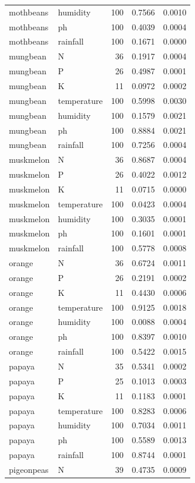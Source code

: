 \begin{tabular}{llrrr}
mothbeans & humidity & 100 & 0.7566 & 0.0010 \\
mothbeans & ph & 100 & 0.4039 & 0.0004 \\
mothbeans & rainfall & 100 & 0.1671 & 0.0000 \\
mungbean & N & 36 & 0.1917 & 0.0004 \\
mungbean & P & 26 & 0.4987 & 0.0001 \\
mungbean & K & 11 & 0.0972 & 0.0002 \\
mungbean & temperature & 100 & 0.5998 & 0.0030 \\
mungbean & humidity & 100 & 0.1579 & 0.0021 \\
mungbean & ph & 100 & 0.8884 & 0.0021 \\
mungbean & rainfall & 100 & 0.7256 & 0.0004 \\
muskmelon & N & 36 & 0.8687 & 0.0004 \\
muskmelon & P & 26 & 0.4022 & 0.0012 \\
muskmelon & K & 11 & 0.0715 & 0.0000 \\
muskmelon & temperature & 100 & 0.0423 & 0.0004 \\
muskmelon & humidity & 100 & 0.3035 & 0.0001 \\
muskmelon & ph & 100 & 0.1601 & 0.0001 \\
muskmelon & rainfall & 100 & 0.5778 & 0.0008 \\
orange & N & 36 & 0.6724 & 0.0011 \\
orange & P & 26 & 0.2191 & 0.0002 \\
orange & K & 11 & 0.4430 & 0.0006 \\
orange & temperature & 100 & 0.9125 & 0.0018 \\
orange & humidity & 100 & 0.0088 & 0.0004 \\
orange & ph & 100 & 0.8397 & 0.0010 \\
orange & rainfall & 100 & 0.5422 & 0.0015 \\
papaya & N & 35 & 0.5341 & 0.0002 \\
papaya & P & 25 & 0.1013 & 0.0003 \\
papaya & K & 11 & 0.1183 & 0.0001 \\
papaya & temperature & 100 & 0.8283 & 0.0006 \\
papaya & humidity & 100 & 0.7034 & 0.0011 \\
papaya & ph & 100 & 0.5589 & 0.0013 \\
papaya & rainfall & 100 & 0.8744 & 0.0001 \\
pigeonpeas & N & 39 & 0.4735 & 0.0009 \\

\end{tabular}
